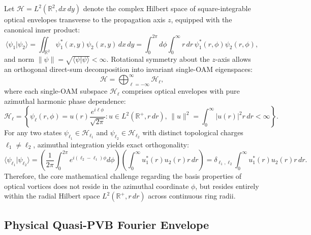 \documentclass{optica-article}
\begin{document}
Let $\mathcal{H} = L^2(\mathbb{R}^2, dx \, dy)$ denote the complex Hilbert space of square-integrable optical envelopes transverse to the propagation axis $z$, equipped with the canonical inner product:
\begin{equation}
\langle \psi_1 | \psi_2 \rangle = \iint_{\mathbb{R}^2} \psi_1^*(x, y) \psi_2(x, y) \, dx \, dy = \int_0^{2\pi} d\phi \int_0^\infty r \, dr \, \psi_1^*(r, \phi) \psi_2(r, \phi),
\label{eq:hilbert_inner_product}
\end{equation}
and norm $\|\psi\| = \sqrt{\langle \psi | \psi \rangle} < \infty$. Rotational symmetry about the $z$-axis allows an orthogonal direct-sum decomposition into invariant single-OAM eigenspaces:
\begin{equation}
\mathcal{H} = \bigoplus_{\ell=-\infty}^\infty \mathcal{H}_\ell,
\label{eq:direct_sum_decomposition}
\end{equation}
where each single-OAM subspace $\mathcal{H}_\ell$ comprises optical envelopes with pure azimuthal harmonic phase dependence:
\begin{equation}
\mathcal{H}_\ell = \left\{ \psi_\ell(r, \phi) = u(r) \frac{e^{i \ell \phi}}{\sqrt{2\pi}} : u \in L^2(\mathbb{R}^+, r \, dr), \, \|u\|^2 = \int_0^\infty |u(r)|^2 r \, dr < \infty \right\}.
\label{eq:single_oam_subspace}
\end{equation}
For any two states $\psi_{\ell_1} \in \mathcal{H}_{\ell_1}$ and $\psi_{\ell_2} \in \mathcal{H}_{\ell_2}$ with distinct topological charges $\ell_1 \neq \ell_2$, azimuthal integration yields exact orthogonality:
\begin{equation}
\langle \psi_{\ell_1} | \psi_{\ell_2} \rangle = \left( \frac{1}{2\pi} \int_0^{2\pi} e^{i(\ell_2 - \ell_1)\phi} d\phi \right) \left( \int_0^\infty u_1^*(r) u_2(r) r \, dr \right) = \delta_{\ell_1, \ell_2} \int_0^\infty u_1^*(r) u_2(r) r \, dr.
\label{eq:azimuthal_orthogonality}
\end{equation}
Therefore, the core mathematical challenge regarding the basis properties of optical vortices does not reside in the azimuthal coordinate $\phi$, but resides entirely within the radial Hilbert space $L^2(\mathbb{R}^+, r \, dr)$ across continuous ring radii.

\subsection{Physical Quasi-PVB Fourier Envelope}
\end{document}

